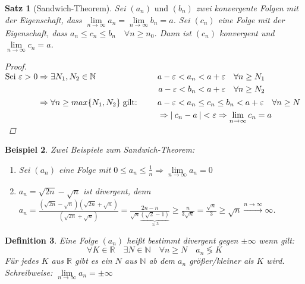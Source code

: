 \documentclass[a4paper,titlepage,oneside]{article}
\def\N{\ensuremath{\mathbb{N}} }
\def\R{\ensuremath{\mathbb{R}} }
\renewcommand{\epsilon}{\ensuremath{\varepsilon} }
\def\sp{\hspace{0,1cm}}
\renewcommand{\liminf}[2][n]{\ensuremath{\lim\limits_{#1 \rightarrow \infty}{#2}}}
\newcommand{\abs}[1]{\ensuremath{\left|\:#1\:\right|}}
\newcommand{\longtoinf}[1][n]{\ensuremath{\overset{\scriptscriptstyle{#1 \to \infty}}{\longrightarrow}}}
\theoremstyle{thmstyle}
\newtheorem{satz}{Satz}[subsection]
\newtheorem{defi}[satz]{Definition}
\newtheorem{bsp}[satz]{Beispiel}
\begin{document}
\begin{satz}[Sandwich-Theorem]
Sei \((a_n)\text{ und }(b_n)\) zwei konvergente Folgen mit der Eigenschaft, dass \(\liminf{a_n} = \liminf{b_n} = a\).
Sei \((c_n)\) eine Folge mit der Eigenschaft, dass \(a_n \le c_n \le b_n \quad \forall n \ge n_0\).
Dann ist \((c_n)\) konvergent und \(\liminf{c_n} = a\).
\begin{proof}
\begin{math}
\begin{aligned}[t] \displaystyle \text{Sei }\epsilon > 0 &\Rightarrow \exists  N_1, N_2 \in \N \quad
&&\begin{aligned}[t] a - \epsilon < a_n < a + \epsilon & \quad \forall n \ge N_1 \\
			   a - \epsilon < b_n < a + \epsilon & \quad \forall n \ge N_2
\end{aligned} \\
&\Rightarrow \forall n \ge max\{N_1, N_2\} \sp \text{gilt: } \quad &&\begin{aligned}[t] &a-\epsilon < a_n \le c_n \le b_n < a + \epsilon \quad  \forall n \ge N \\
&\Rightarrow \abs{c_n - a} < \epsilon \Rightarrow \liminf{c_n} = a
\end{aligned}
\end{aligned}\\
\end{math}
\end{proof}
\end{satz}

\begin{bsp}
Zwei Beispiele zum Sandwich-Theorem:
\begin{enumerate}
\item Sei \((a_n)\) eine Folge mit \(0 \le a_n \le \frac{1}{n} \Rightarrow \liminf{a_n} = 0\)
\item \(a_n = \sqrt{2n} - \sqrt{n}\) ist divergent, denn \\
$ \displaystyle a_n = \frac{\left(\sqrt{2n} - \sqrt{n}\right)\left(\sqrt{2n} + \sqrt{n}\right)}{\left(\sqrt{2n} + \sqrt{n}\right)} = \frac{2n - n}{\sqrt{n} \underbrace{\left(\sqrt{2} - 1\right)}_{\le3}} \ge \frac{n}{3\sqrt{n}} = \frac{\sqrt{n}}{3} \ge \sqrt{n} \longtoinf \infty $.
\end{enumerate}
\end{bsp}

\begin{defi}
Eine Folge \((a_n)\) heißt bestimmt divergent gegen \(\pm \infty \) wenn gilt:
\[\forall K \in \R \quad \exists N \in \N \quad \forall n \ge N \quad  a_n \lessgtr K \]
Für jedes $K$ aus \R  gibt es ein $N$ aus \N ab dem $a_n$ größer/kleiner als $K$ wird. Schreibweise: \(\liminf{a_n} = \pm \infty \)
\end{defi}
\end{document}

